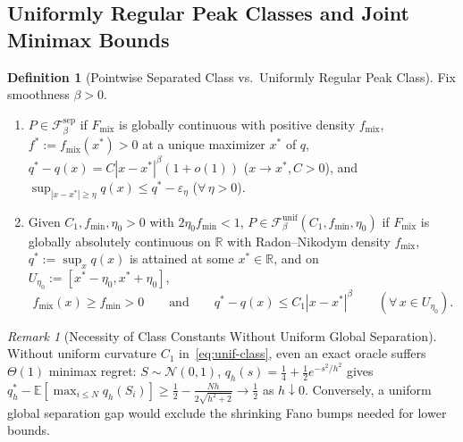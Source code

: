 \documentclass[10pt]{article}
\theoremstyle{plain}
\theoremstyle{definition}
\newtheorem{definition}{Definition}
\theoremstyle{remark}
\newtheorem{remark}{Remark}
\newcommand{\R}{\mathbb{R}}
\newcommand{\E}{\mathbb{E}}
\newcommand{\Fmix}{F_{\mathrm{mix}}}
\newcommand{\fmix}{f_{\mathrm{mix}}}
\begin{document}
\subsection{Uniformly Regular Peak Classes and Joint Minimax Bounds}

\begin{definition}[Pointwise Separated Class vs.\ Uniformly Regular Peak Class]
\label{def:classes}
Fix smoothness $\beta > 0$.
\begin{enumerate}[leftmargin=1.6em,itemsep=1pt,topsep=1pt]
    \item $P \in \mathcal{F}_\beta^{\mathrm{sep}}$ if $\Fmix$ is globally continuous with positive density $\fmix$, $f^* := \fmix(x^*) > 0$ at a unique maximizer $x^*$ of $q$, $q^* - q(x) = C|x - x^*|^\beta(1 + o(1))$ ($x \to x^*, C > 0$), and $\sup_{|x-x^*|\ge\eta} q(x) \le q^* - \varepsilon_\eta$ ($\forall\,\eta > 0$).
    \item Given $C_1, f_{\min}, \eta_0 > 0$ with $2\eta_0 f_{\min} < 1$, $P \in \mathcal{F}_\beta^{\mathrm{unif}}(C_1, f_{\min}, \eta_0)$ if $\Fmix$ is globally absolutely continuous on $\R$ with Radon--Nikodym density $\fmix$, $q^* := \sup_x q(x)$ is attained at some $x^* \in \R$, and on $U_{\eta_0} := [x^* - \eta_0, x^* + \eta_0]$,
    \begin{equation}
    \label{eq:unif-class}
    \fmix(x) \ge f_{\min} > 0 \qquad \text{and} \qquad q^* - q(x) \le C_1 |x - x^*|^\beta \qquad (\forall\, x \in U_{\eta_0}).
    \end{equation}
\end{enumerate}
\end{definition}

\begin{remark}[Necessity of Class Constants Without Uniform Global Separation]
\label{rem:constants}
Without uniform curvature $C_1$ in~\eqref{eq:unif-class}, even an exact oracle suffers $\Theta(1)$ minimax regret: $S \sim \mathcal{N}(0, 1)$, $q_h(s) = \frac{1}{4} + \frac{1}{2}e^{-s^2/h^2}$ gives $q_h^* - \E[\max_{i\le N} q_h(S_i)] \ge \frac{1}{2} - \frac{Nh}{2\sqrt{h^2+2}} \to \frac{1}{2}$ as $h \downarrow 0$. Conversely, a uniform global separation gap would exclude the shrinking Fano bumps needed for lower bounds.
\end{remark}
\end{document}
